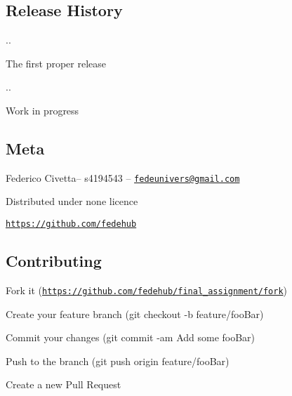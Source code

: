 \subsection*{Release History}


\begin{DoxyItemize}
\item {..}
\begin{DoxyItemize}
\item The first proper release
\end{DoxyItemize}
\item {..}
\begin{DoxyItemize}
\item Work in progress
\end{DoxyItemize}
\end{DoxyItemize}

\subsection*{Meta}

Federico Civetta– s4194543 – \href{mailto:fedeunivers@gmail.com}{\tt fedeunivers@gmail.\+com}

Distributed under none licence

\href{https://github.com/fedehub}{\tt https\+://github.\+com/fedehub}

\subsection*{Contributing}


\begin{DoxyEnumerate}
\item Fork it (\href{https://github.com/fedehub/final_assignment/fork}{\tt https\+://github.\+com/fedehub/final\+\_\+assignment/fork})
\item Create your feature branch ({\ttfamily git checkout -\/b feature/foo\+Bar})
\item Commit your changes ({\ttfamily git commit -\/am \textquotesingle{}Add some foo\+Bar\textquotesingle{}})
\item Push to the branch ({\ttfamily git push origin feature/foo\+Bar})
\item Create a new Pull Request 
\end{DoxyEnumerate}